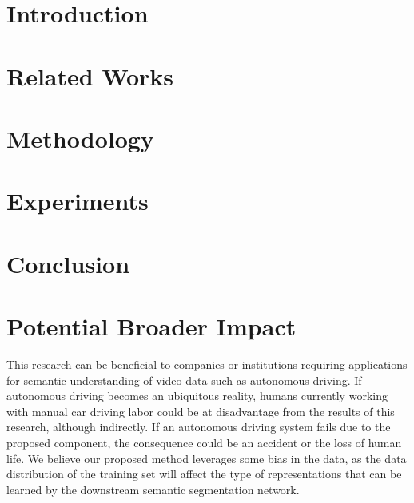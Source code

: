 \documentclass{article}
\begin{document}
\begin{abstract}
\end{abstract}


\section{Introduction}
\label{section-intro}


\section{Related Works}
\label{section-rel}


\section{Methodology}
\label{section-method}


\section{Experiments}
\label{section-exp}


% 

\section{Conclusion}
\label{section-conclusion}



\newpage
\section*{Potential Broader Impact}
This research can be beneficial to companies or institutions requiring applications for semantic understanding of video data such as autonomous driving.
% 
If autonomous driving becomes an ubiquitous reality, humans currently working with manual car driving labor could be at disadvantage from the results of this research, although indirectly.
If an autonomous driving system fails due to the proposed component, the consequence could be an accident or the loss of human life.
We believe our proposed method leverages some bias in the data, as the data distribution of the training set will affect the type of representations that can be learned by the downstream semantic segmentation network.
\end{document}
